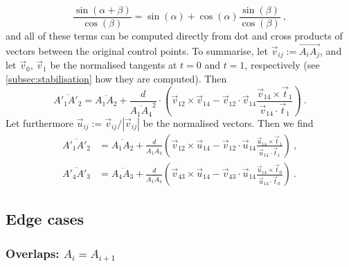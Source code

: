 \documentclass[12pt,a4paper]{article}
\theoremstyle{definition}
\newcommand{\tv}{\vec{t}}
\newcommand{\uv}{\vec{u}}
\newcommand{\vv}{\vec{v}}
\begin{document}
\begin{equation}
  \frac{\sin(\alpha + \beta)}{\cos(\beta)} = \sin(\alpha) + \cos(\alpha) \frac{\sin(\beta)}{\cos(\beta)} \ ,
\end{equation}
and all of these terms can be computed directly from dot and cross products of vectors between the original control points. To summarise, let $\vv_{ij} := \overrightarrow{A_iA_j}$, and let $\vv_0$, $\vv_1$ be the normalised tangents at $t=0$ and $t=1$, respectively (see \cref{subsec:stabilisation} how they are computed). Then
\begin{equation}
  \overline{A'_1A'_2} = \overline{A_1A_2} + \frac{d}{\overline{A_1A_4}^2}\cdot\left(\vv_{12} \times \vv_{14} - \vv_{12}\cdot\vv_{14} \frac{\vv_{14}\times\tv_1}{\vv_{14}\cdot\tv_1} \right) \ .
\end{equation}
Let furthermore $\uv_{ij} := \vv_{ij}/|\vv_{ij}|$ be the normalised vectors. Then we find
\begin{equation}%
  \label{eq:finalPrimeDistance}
  \begin{aligned}
    \overline{A'_1A'_2} &= \overline{A_1A_2} + \frac{d}{\overline{A_1A_4}} \left(\vv_{12} \times \uv_{14} - \vv_{12}\cdot\uv_{14} \frac{\uv_{14}\times\tv_1}{\uv_{14}\cdot\tv_1} \right) \ , \\
    \overline{A'_4A'_3} &= \overline{A_4A_3} + \frac{d}{\overline{A_1A_4}} \left(\vv_{43} \times \uv_{14} - \vv_{43}\cdot\uv_{14} \frac{\uv_{14}\times\tv_0}{\uv_{14}\cdot\tv_0} \right) \ .
  \end{aligned}
\end{equation}



\subsection{Edge cases}

\subsubsection{Overlaps: $A_i = A_{i+1}$}
\end{document}
